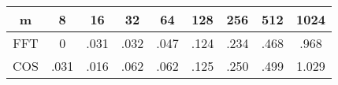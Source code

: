 \begin{minipage}{\textwidth}
\begin{center}
\begin{framed}
\begin{tabular}{c|c|c|c|c|c|c|c|c}
m & 8 & 16 & 32 & 64 & 128 & 256 & 512 & 1024 \\
\hline
FFT & 0 & .031 & .032 & .047 & .124 & .234 & .468 & .968 \\
COS & .031 & .016 & .062 & .062 & .125 & .250 & .499 & 1.029 \\
\end{tabular} 
 \label{table5}
\end{framed}
\end{center}
\end{minipage}
